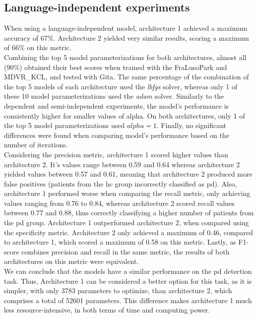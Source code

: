 \subsection{Language-independent experiments}

When using a language-independent model, architecture 1 achieved a maximum accuracy of 67\%. Architecture 2 yielded very similar results, scoring a maximum of 66\% on this metric. \\
Combining the top 5 model parameterizations for both architectures, almost all (90\%) obtained their best scores when trained with the FraLusoPark and MDVR\_KCL, and tested with Gita. The same percentage of the combination of the top 5 models of each architecture used the \textit{lbfgs} solver, whereas only 1 of these 10 model 
parameterizations used the \textit{adam} solver. Similarly to the dependent and semi-independent experiments, the model's performance is consistently higher for smaller values of alpha. On both architectures, only 1 of the top 5 model parameterizations used $alpha = 1$. Finally, no significant differences were found when comparing model's performance based on the number of iterations. \\
Considering the precision metric, architecture 1 scored higher values than architecture 2. It's values range between 0.59 and 0.64 whereas architecture 2 yielded values between 0.57 and 0.61, meaning that architecture 2 produced more false positives (patients from the \gls{hc} group incorrectly classified as \gls{pd}). Also, architecture 1 performed worse when comparing the recall metric, only achieving values ranging from 0.76 to 0.84, whereas architecture 2 scored recall values between 0.77 and 0.88, thus correctly classifying a higher number of patients from the \gls{pd} group. Architecture 1 outperformed architecture 2, when compared using the specificity metric. Architecture 2 only achieved a maximum of 0.46, compared to architecture 1, which scored a maximum of 0.58 on this metric. Lastly, as F1-score combines precision and recall in the same metric, the results of both architectures on this metric were equivalent. \\
We can conclude that the models have a similar performance on the \gls{pd} detection task. Thus, Architecture 1 can be considered a better option for this task, as it is simpler, with only 3783 parameters to optimize, than architecture 2, which comprises a total of 52601 parameters. This difference makes architecture 1 much less resource-intensive, in both terms of time and computing power.

